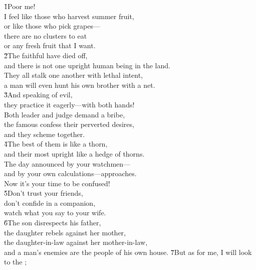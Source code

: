 \begin{poetry}
\poeml {}
\v{1}Poor me! \\
\poeml I feel like those who harvest summer fruit, \\
\poemlll       or like those who pick grapes--- \\
\poeml there are no clusters to eat \\
\poemll    or any fresh fruit that I want. \\
\poeml \v{2}The faithful have died off, \\
\poemll    and there is not one upright human being in the land. \\
\poeml They all stalk one another with lethal intent, \\
\poemll    a man will even hunt his own brother with a net. \\
\poeml \v{3}And speaking of evil, \\
\poemll    they practice it eagerly---with both hands! \\
\poeml Both leader and judge demand a bribe, \\
\poemll    the famous confess their perverted desires, \\
\poemlll       and they scheme together. \\
\poeml \v{4}The best of them is like a thorn, \\
\poemll    and their most upright like a hedge of thorns. \\
\poeml The day announced by your watchmen--- \\
\poemll    and by your own calculations---approaches. \\
\poemlll       Now it's your time to be confused! \\
\poeml \v{5}Don't trust your friends, \\
\poemll    don't confide in a companion, \\
\poemlll       watch what you say to your wife. \\
\poeml \v{6}The son disrespects his father, \\
\poemll    the daughter rebels against her mother, \\
\poeml the daughter-in-law against her mother-in-law, \\
\poemll    and a man's enemies are the people of his own house.
\poeml \v{7}But as for me, I will look to the ; \\

\end{poetry}
